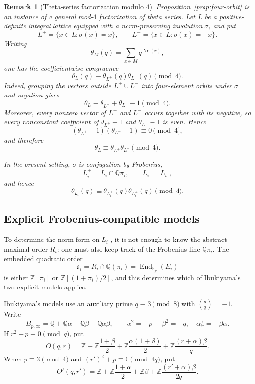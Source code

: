\documentclass[10pt,a4paper]{amsart}
\newtheorem{remark}[theorem]{Remark}
\newcommand{\Q}{\mathbb{Q}}
\newcommand{\Z}{\mathbb{Z}}
\newcommand{\F}{\mathbb{F}}
\newcommand{\End}{\operatorname{End}}
\newcommand{\Nr}{\operatorname{Nr}}
\newcommand{\leg}[2]{\left(\frac{#1}{#2}\right)}
\begin{document}
\begin{remark}[Theta-series factorization modulo $4$]
Proposition~\ref{prop:four-orbit} is an instance of a general mod-$4$
factorization of theta series. Let $L$ be a positive-definite integral
lattice equipped with a norm-preserving involution $\sigma$, and put
\[
  L^{+}=\{x\in L:\sigma(x)=x\},
  \qquad
  L^{-}=\{x\in L:\sigma(x)=-x\}.
\]
Writing
\[
  \theta_M(q)=\sum_{x\in M}q^{\Nr(x)},
\]
one has the coefficientwise congruence
\[
  \theta_L(q)\equiv
  \theta_{L^{+}}(q)\theta_{L^{-}}(q)
  \pmod4.
\]
Indeed, grouping the vectors outside $L^{+}\cup L^{-}$ into
four-element orbits under $\sigma$ and negation gives
\[
  \theta_L\equiv\theta_{L^{+}}+\theta_{L^{-}}-1\pmod4.
\]
Moreover, every nonzero vector of $L^{+}$ and $L^{-}$ occurs together
with its negative, so every nonconstant coefficient of
$\theta_{L^{+}}-1$ and $\theta_{L^{-}}-1$ is even. Hence
\[
  (\theta_{L^{+}}-1)(\theta_{L^{-}}-1)\equiv0\pmod4,
\]
and therefore
\[
  \theta_L\equiv\theta_{L^{+}}\theta_{L^{-}}\pmod4.
\]

In the present setting, $\sigma$ is conjugation by Frobenius,
\[
  L_i^{+}=L_i\cap\Q\pi_i,
  \qquad
  L_i^{-}=L_i^\perp,
\]
and hence
\[
  \theta_{L_i}(q)\equiv
  \theta_{L_i^{+}}(q)\theta_{L_i^\perp}(q)
  \pmod4.
\]
\end{remark}

\subsection{Explicit Frobenius-compatible models}

To determine the norm form on $L_i^\perp$, it is not enough to know the
abstract maximal order $R_i$: one must also keep track of the Frobenius
line $\Q\pi_i$. The embedded quadratic order
\[
  \mathfrak o_i
  =R_i\cap\Q(\pi_i)
  =\End_{\F_p}(E_i)
\]
is either $\Z[\pi_i]$ or $\Z[(1+\pi_i)/2]$, and this determines which of
Ibukiyama's two explicit models applies.


Ibukiyama's models use an auxiliary prime $q\equiv3\pmod8$ with $\leg{p}{q}=-1$.  Write
\[
 B_{p,\infty}=\Q+\Q\alpha+\Q\beta+\Q\alpha\beta,
 \qquad
 \alpha^2=-p,\quad \beta^2=-q,\quad \alpha\beta=-\beta\alpha.
\]
If $r^2+p\equiv0\pmod q$, put
\[
 O(q,r)=\Z+\Z\frac{1+\beta}{2}
       +\Z\frac{\alpha(1+\beta)}2
       +\Z\frac{(r+\alpha)\beta}{q}.
\]
When $p\equiv3\pmod4$ and $(r')^2+p\equiv0\pmod{4q}$, put
\[
 O'(q,r')=\Z+\Z\frac{1+\alpha}{2}
       +\Z\beta
       +\Z\frac{(r'+\alpha)\beta}{2q}.
\]
\end{document}
